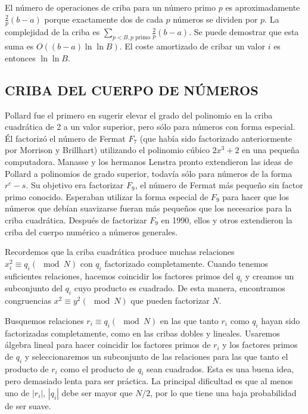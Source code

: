        El número de operaciones de criba para un número primo $p$ es aproximadamente $\frac{2}{p} (b - a)$ porque exactamente dos de cada $p$ números se dividen por $p$. La complejidad de la criba es $\sum_{p<B,p \text{ primo}} \frac{2}{p} (b-a)$. Se puede demostrar que esta suma es $O((b - a) \ln \ln B)$. El coste amortizado de cribar un valor $i$ es entonces $\ln \ln B$. \citep{Pomerance1982}

        \subsection{CRIBA DEL CUERPO DE NÚMEROS}
        Pollard fue el primero en sugerir elevar el grado del polinomio en la criba cuadrática de 2 a un valor superior, pero sólo para números con forma especial. Él factorizó el número de Fermat $F_7$ (que había sido factorizado anteriormente por Morrison y Brillhart) utilizando el polinomio cúbico $2x^3+2$ en una pequeña computadora. Manasse y los hermanos Lenstra pronto extendieron las ideas de Pollard a polinomios de grado superior, todavía sólo para números de la forma $r^e - s$. Su objetivo era factorizar $F_9$, el número de Fermat más pequeño sin factor primo conocido. Esperaban utilizar la forma especial de $F_9$ para hacer que los números que debían suavizarse fueran más pequeños que los necesarios para la criba cuadrática. Después de factorizar $F_9$ en 1990, ellos y otros extendieron la criba del cuerpo numérico a números generales.

        Recordemos que la criba cuadrática produce muchas relaciones $x^2_i \equiv q_i (\mod N)$ con $q_i$ factorizado completamente. Cuando tenemos suficientes relaciones, hacemos coincidir los factores primos del $q_i$ y creamos un subconjunto del $q_i$ cuyo producto es cuadrado. De esta manera, encontramos congruencias $x^2 \equiv y^2 (\mod N)$ que pueden factorizar $N$.

        Busquemos relaciones $r_i \equiv q_i (\mod N)$ en las que tanto $r_i$ como $q_i$ hayan sido factorizadas completamente, como en las cribas dobles y lineales. Usaremos álgebra lineal para hacer coincidir los factores primos de $r_i$ y los factores primos de $q_i$ y seleccionaremos un subconjunto de las relaciones para las que tanto el producto de $r_i$ como el producto de $q_i$ sean cuadrados. Esta es una buena idea, pero demasiado lenta para ser práctica. La principal dificultad es que al menos uno de $|r_i|$, $|q_i|$ debe ser mayor que $N/2$, por lo que tiene una baja probabilidad de ser suave. \citep{Pomerance1994}

